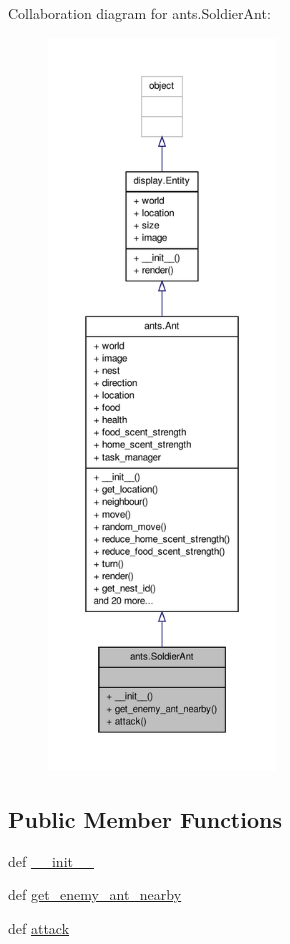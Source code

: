 Collaboration diagram for ants.\+Soldier\+Ant\+:
\nopagebreak
\begin{figure}[H]
\begin{center}
\leavevmode
\includegraphics[height=550pt]{classants_1_1SoldierAnt__coll__graph}
\end{center}
\end{figure}
\subsection*{Public Member Functions}
\begin{DoxyCompactItemize}
\item 
def \hyperlink{classants_1_1SoldierAnt_adaaa2dc645cd3f4c190a86caa7e18f35}{\+\_\+\+\_\+init\+\_\+\+\_\+}
\item 
def \hyperlink{classants_1_1SoldierAnt_aa3d00e2aca5711f0b5784fd2ec0f4989}{get\+\_\+enemy\+\_\+ant\+\_\+nearby}
\item 
def \hyperlink{classants_1_1SoldierAnt_a66062d822fc415e73332f7b13cf853c8}{attack}
\end{DoxyCompactItemize}
